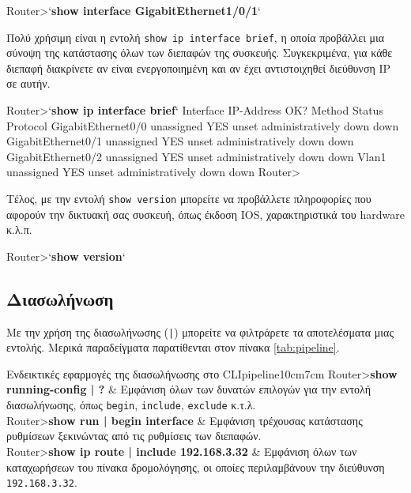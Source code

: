 \documentclass{EdipyLabs} %
\begin{document}
\begin{CommandBox}
Router>`\textbf{show interface GigabitEthernet1/0/1}`
\end{CommandBox}

Πολύ χρήσιμη είναι η εντολή \texttt{show ip interface brief}, η οποία προβάλλει μια σύνοψη της κατάστασης όλων των διεπαφών της συσκευής. Συγκεκριμένα, για κάθε διεπαφή διακρίνετε αν είναι ενεργοποιημένη και αν έχει αντιστοιχηθεί διεύθυνση IP σε αυτήν.

\begin{CommandBox}
Router>`\textbf{show ip interface brief}`
Interface           IP-Address   OK? Method Status                Protocol 
GigabitEthernet0/0  unassigned   YES unset  administratively down down 
GigabitEthernet0/1  unassigned   YES unset  administratively down down 
GigabitEthernet0/2  unassigned   YES unset  administratively down down 
Vlan1               unassigned   YES unset  administratively down down
Router>
\end{CommandBox}

Τέλος, με την εντολή \texttt{show version} μπορείτε να προβάλλετε πληροφορίες που αφορούν την δικτυακή σας συσκευή, όπως έκδοση IOS, χαρακτηριστικά του hardware κ.λ.π.

\begin{CommandBox}
Router>`\textbf{show version}`
\end{CommandBox}

\subsection{Διασωλήνωση}
Με την χρήση της διασωλήνωσης (\texttt{|}) μπορείτε να φιλτράρετε τα αποτελέσματα μιας εντολής. Μερικά παραδείγματα παρατίθενται στον πίνακα \ref{tab:pipeline}.

\begin{CommandTable*}{Ενδεικτικές εφαρμογές της διασωλήνωσης στο CLI}{pipeline}{10cm}{7cm}
	Router>\textbf{show running-config | ?} & Εμφάνιση όλων των δυνατών επιλογών για την εντολή διασωλήνωσης, όπως \texttt{begin}, \texttt{include}, \texttt{exclude} κ.τ.λ. \\[0.25cm]
	Router>\textbf{show run | begin interface} & Εμφάνιση τρέχουσας κατάστασης ρυθμίσεων ξεκινώντας από τις ρυθμίσεις των διεπαφών.\\[0.25cm]
	Router>\textbf{show ip route | include 192.168.3.32} & Εμφάνιση όλων των καταχωρήσεων του πίνακα δρομολόγησης, οι οποίες περιλαμβάνουν την διεύθυνση \texttt{192.168.3.32}.
\end{CommandTable*}
\end{document}
